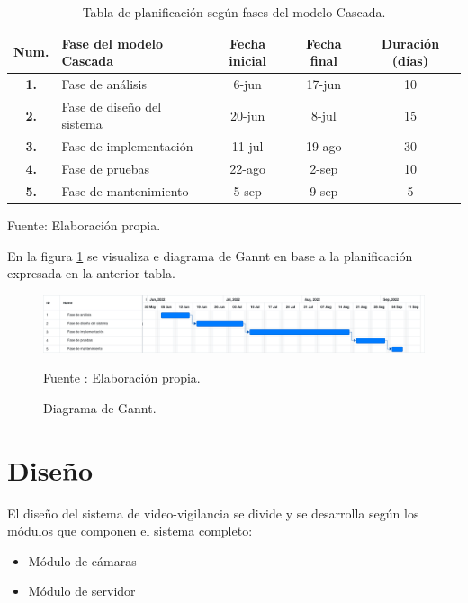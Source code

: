 \begin{table}[H]
    \caption{Tabla de planificación según fases del modelo Cascada.}
    \label{tabla:planning}
    \begin{center}
        \begin{tabular}{|c|l|c|c|c|}
            \hline
            \textbf{Num.} & \textbf{Fase del modelo Cascada}  &  \textbf{Fecha inicial} & \textbf{Fecha final} & \textbf{Duración (días)}\\ \hline
            \textbf{1.} & Fase de análisis        & 6-jun        & 17-jun        & 10        \\ \hline
            \textbf{2.} & Fase de diseño del sistema       & 20-jun        & 8-jul        & 15        \\ \hline
            \textbf{3.} & Fase de implementación        & 11-jul        & 19-ago        & 30        \\ \hline
            \textbf{4.} & Fase de pruebas        & 22-ago         &   2-sep     &    10     \\ \hline
            \textbf{5.} & Fase de mantenimiento        & 5-sep        & 9-sep        & 5        \\ \hline
        \end{tabular}
        \begin{center}            
            Fuente: Elaboración propia.
        \end{center}
    \end{center}
\end{table}

En la figura \ref{fig:gannt} se visualiza e diagrama de Gannt en base a la planificación expresada en la anterior tabla.
\begin{figure}[H]
    \begin{center}
        \includegraphics[width=18cm]{img/capitulo_4/gant.png}
    \end{center}
    \begin{center}
        \caption{Diagrama de Gannt.}
        Fuente : Elaboración propia.
        \label{fig:gannt}
    \end{center}
\end{figure}

\section{Diseño}
El diseño del sistema de video-vigilancia se divide y se desarrolla según los módulos que componen el sistema completo:
\begin{itemize}
    \item Módulo de cámaras
    \item Módulo de servidor
\end{itemize}

